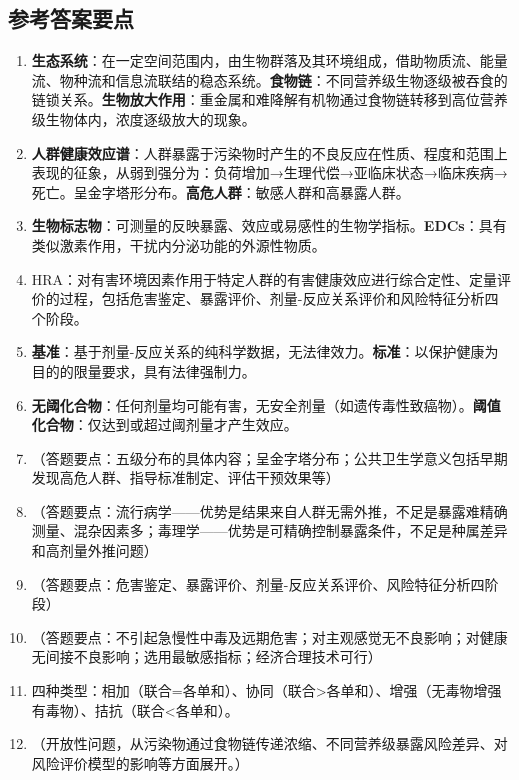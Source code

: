 \documentclass[10pt,a4paper,oneside]{ctexbook}
\begin{document}
\subsection*{参考答案要点}

\begin{enumerate}[leftmargin=*, itemsep=5pt]
    \item \textbf{生态系统}：在一定空间范围内，由生物群落及其环境组成，借助物质流、能量流、物种流和信息流联结的稳态系统。\textbf{食物链}：不同营养级生物逐级被吞食的链锁关系。\textbf{生物放大作用}：重金属和难降解有机物通过食物链转移到高位营养级生物体内，浓度逐级放大的现象。
    \item \textbf{人群健康效应谱}：人群暴露于污染物时产生的不良反应在性质、程度和范围上表现的征象，从弱到强分为：负荷增加→生理代偿→亚临床状态→临床疾病→死亡。呈金字塔形分布。\textbf{高危人群}：敏感人群和高暴露人群。
    \item \textbf{生物标志物}：可测量的反映暴露、效应或易感性的生物学指标。\textbf{EDCs}：具有类似激素作用，干扰内分泌功能的外源性物质。
    \item HRA：对有害环境因素作用于特定人群的有害健康效应进行综合定性、定量评价的过程，包括危害鉴定、暴露评价、剂量-反应关系评价和风险特征分析四个阶段。
    \item \textbf{基准}：基于剂量-反应关系的纯科学数据，无法律效力。\textbf{标准}：以保护健康为目的的限量要求，具有法律强制力。
    \item \textbf{无阈化合物}：任何剂量均可能有害，无安全剂量（如遗传毒性致癌物）。\textbf{阈值化合物}：仅达到或超过阈剂量才产生效应。
    \item （答题要点：五级分布的具体内容；呈金字塔分布；公共卫生学意义包括早期发现高危人群、指导标准制定、评估干预效果等）
    \item （答题要点：流行病学——优势是结果来自人群无需外推，不足是暴露难精确测量、混杂因素多；毒理学——优势是可精确控制暴露条件，不足是种属差异和高剂量外推问题）
    \item （答题要点：危害鉴定、暴露评价、剂量-反应关系评价、风险特征分析四阶段）
    \item （答题要点：不引起急慢性中毒及远期危害；对主观感觉无不良影响；对健康无间接不良影响；选用最敏感指标；经济合理技术可行）
    \item 四种类型：相加（联合=各单和）、协同（联合>各单和）、增强（无毒物增强有毒物）、拮抗（联合<各单和）。
    \item （开放性问题，从污染物通过食物链传递浓缩、不同营养级暴露风险差异、对风险评价模型的影响等方面展开。）
\end{enumerate}
\end{document}
